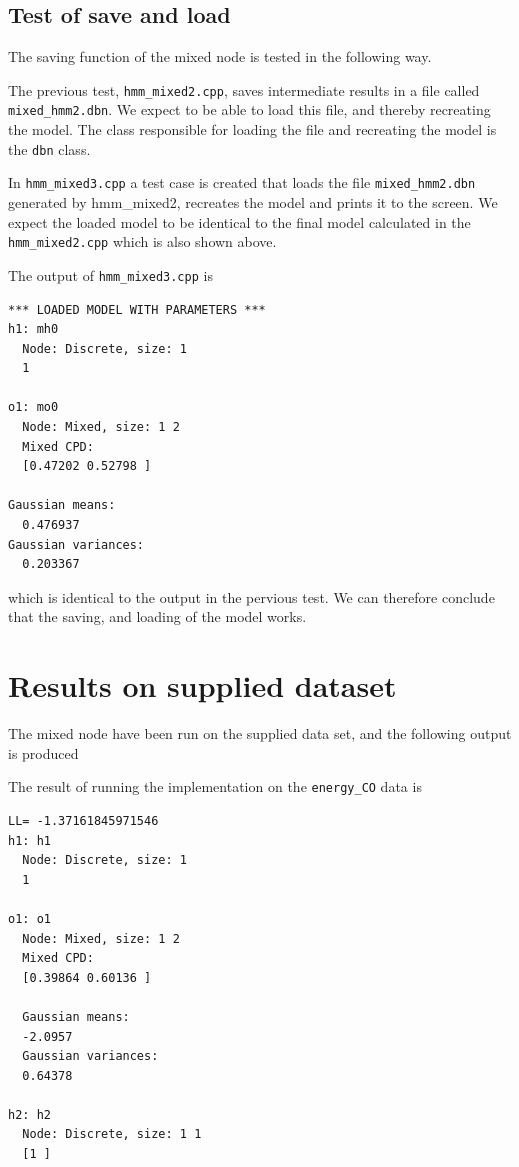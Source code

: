 \documentclass[10pt, journal, compsoc, a4paper]{IEEEtran}
\begin{document}



\subsection{Test of save and load} %
\label{sub:test_of_save_and_load}
The saving function of the mixed node is tested in the following way. 

The previous test, \texttt{hmm\_mixed2.cpp}, saves intermediate results in a file called \texttt{mixed\_hmm2.dbn}. We expect to be able to load this file, and thereby recreating the model. The class responsible for loading the file and recreating the model is the \texttt{dbn} class. 

In \texttt{hmm\_mixed3.cpp} a test case is created that loads the file \texttt{mixed\_hmm2.dbn} generated by hmm\_mixed2, recreates the model and prints it to the screen. We expect the loaded model to be identical to the final model calculated in the \texttt{hmm\_mixed2.cpp} which is also shown above.

The output of \texttt{hmm\_mixed3.cpp} is 

\begin{verbatim}
*** LOADED MODEL WITH PARAMETERS ***
h1: mh0
  Node: Discrete, size: 1 
  1 

o1: mo0
  Node: Mixed, size: 1 2 
  Mixed CPD: 
  [0.47202 0.52798 ]

Gaussian means: 
  0.476937 
Gaussian variances: 
  0.203367   
\end{verbatim}
which is identical to the output in the pervious test. We can therefore conclude that the saving, and loading of the model works.




\section{Results on supplied dataset} %
\label{sec:results}
The mixed node have been run on the supplied data set, and the following output is produced

The result of running the implementation on the \texttt{energy\_CO} data is

\begin{verbatim}
LL= -1.37161845971546
h1: h1
  Node: Discrete, size: 1 
  1 

o1: o1
  Node: Mixed, size: 1 2 
  Mixed CPD: 
  [0.39864 0.60136 ]

  Gaussian means: 
  -2.0957 
  Gaussian variances: 
  0.64378 

h2: h2
  Node: Discrete, size: 1 1 
  [1 ]  
\end{verbatim}
\end{document}
